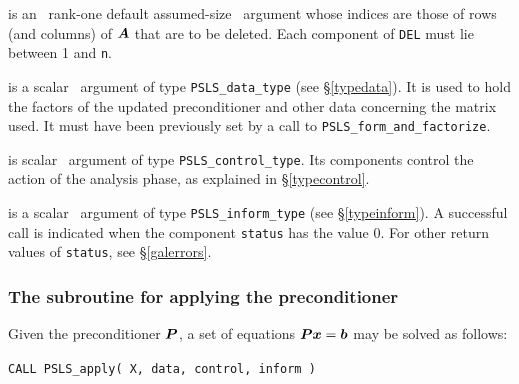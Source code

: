 \documentclass{galahad}
\newcommand{\packagename}{PSLS}
\begin{document}
\begin{description}
 is an \intentin\ rank-one default assumed-size 
\integer\ argument whose indices are those of rows (and columns) of ${\bm{A}}$
that are to be deleted. Each component of {\tt DEL} must lie between 1 and 
{\tt n}.

 is a scalar \intentinout\ argument of type
{\tt \packagename\_data\_type}
(see \S\ref{typedata}). It is used to hold the factors of the 
updated preconditioner and other data concerning the matrix used.
It must have been previously set by a call to
{\tt \packagename\_form\_and\_factorize}.

 is scalar \intentin\ argument of type
{\tt \packagename\_control\_type}. Its components control the action
of the analysis phase, as explained in
\S\ref{typecontrol}.

 is a scalar \intentinout\ argument of type
{\tt \packagename\_inform\_type}
(see \S\ref{typeinform}).
A successful call is indicated when the  component {\tt status} has the value 0.
For other return values of {\tt status}, see \S\ref{galerrors}.

\end{description}


\subsubsection{The subroutine for applying the preconditioner}
\label{solve}
Given the preconditioner ${\bm{P}}$, a set of equations 
${\bm{P}} {\bm{x}} = {\bm{b}}$ may be solved as follows:

\hskip0.5in
{\tt CALL \packagename\_apply( X, data, control, inform )}
\end{document}

